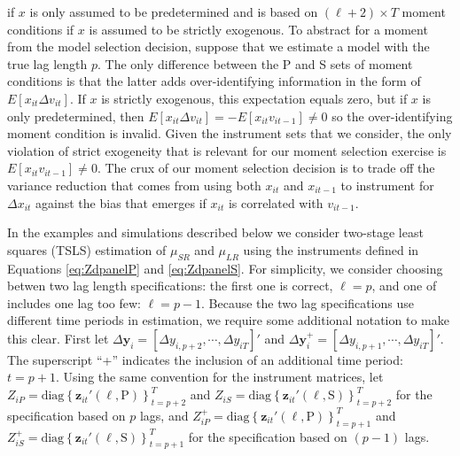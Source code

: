 if $x$ is only assumed to be predetermined and is based on $(\ell + 2)\times T$ moment conditions 
if $x$ is assumed to be strictly exogenous.
To abstract for a moment from the model selection decision, suppose that we estimate a model with the true lag length $p$.
The only difference between the P and S sets of moment conditions is that the latter adds over-identifying information in the form of $E[x_{it}\Delta v_{it}]$.
If $x$ is strictly exogenous, this expectation equals zero, but if $x$ is only predetermined, then $E[x_{it}\Delta v_{it}] = -E[x_{it}v_{it-1}] \neq 0$ so the over-identifying moment condition is invalid.
Given the instrument sets that we consider, the only violation of strict exogeneity that is relevant for our moment selection exercise is $E[x_{it}v_{it-1}]\neq 0$.
The crux of our moment selection decision is to trade off the variance reduction that comes from using both $x_{it}$ and $x_{it-1}$ to instrument for $\Delta x_{it}$ against the bias that emerges if $x_{it}$ is correlated with $v_{it-1}$.

In the examples and simulations described below we consider two-stage least squares (TSLS) estimation of $\mu_{SR}$ and $\mu_{LR}$ using the instruments defined in Equations \ref{eq:ZdpanelP} and \ref{eq:ZdpanelS}.
For simplicity, we consider choosing betwen two lag length specifications: the first one is correct, $\ell = p$, and one of includes one lag too few: $\ell = p - 1$.
Because the two lag specifications use different time periods in estimation, we require some additional notation to make this clear. 
First let $\Delta \mathbf{y}_{i} = [\Delta y_{i,p+2}, \cdots, \Delta y_{iT}]'$ and $\Delta \mathbf{y}^+_{i} = [\Delta y_{i,p+1}, \cdots, \Delta y_{iT}]'$.
The superscript ``+'' indicates the inclusion of an additional time period: $t = p+1$.
Using the same convention for the instrument matrices, let $Z_{iP} = \mbox{diag}\left\{ \mathbf{z}_{it}'(\ell,\mbox{P}) \right\}_{t=p+2}^T$ and $Z_{iS} = \mbox{diag}\left\{ \mathbf{z}_{it}'(\ell,\mbox{S}) \right\}_{t=p+2}^T$ for the specification based on $p$ lags, and $Z_{iP}^+ = \mbox{diag}\left\{ \mathbf{z}_{it}'(\ell,\mbox{P}) \right\}_{t=p+1}^T$ and $Z_{iS}^+ = \mbox{diag}\left\{ \mathbf{z}_{it}'(\ell,\mbox{S}) \right\}_{t=p+1}^T$ for the specification based on $(p - 1)$ lags.


